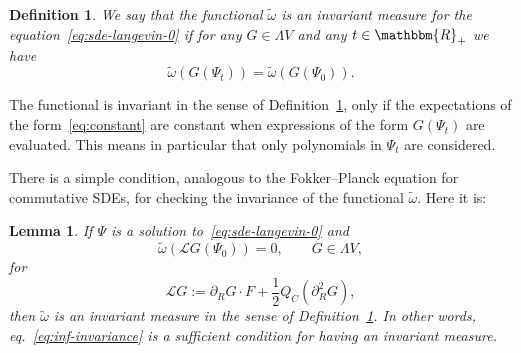 \documentclass[11pt]{article}
\newcommand{\assign}{:=}
\newtheorem{definition}{Definition}
\newtheorem{lemma}{Lemma}
\begin{document}
\begin{definition}
  \label{definition_invariant}We say that the functional $\tilde{\omega}$ is
  an invariant measure for the equation~{\eqref{eq:sde-langevin-0}} if for any
  $G \in \Lambda V$ and any $t \in \mathbbm{R}_+$ we have
  \begin{equation}
    \tilde{\omega} (G (\Psi_t)) = \tilde{\omega} (G (\Psi_0)) .
    \label{eq:constant}
  \end{equation}
\end{definition}

\begin{remark}
  The functional is invariant in the sense of
  Definition~\ref{definition_invariant}, only if the expectations of the
  form~{\eqref{eq:constant}} are constant when expressions of the form $G
  (\Psi_t)$ are evaluated. This means in particular that only polynomials in
  $\Psi_t$ are considered.
\end{remark}

There is a simple condition, analogous to the Fokker--Planck equation for
commutative SDEs, for checking the invariance of the functional
$\tilde{\omega}$. Here it is:

\begin{lemma}
  \label{lemma_invariant}If $\Psi$ is a solution
  to~{\eqref{eq:sde-langevin-0}} and
  \begin{equation}
    \tilde{\omega} (\mathcal{L}G (\Psi_0)) = 0, \qquad G \in \Lambda V
    \label{eq:inf-invariance},
  \end{equation}
  for
  \[ \mathcal{L}G \assign \partial_R G \cdot F + \frac{1}{2} Q_C (\partial_R^2
     G), \]
  then $\tilde{\omega}$ is an invariant measure in the sense of
  Definition~\ref{definition_invariant}. In other words,
  eq.~{\eqref{eq:inf-invariance}} is a sufficient condition for having an
  invariant measure.
\end{lemma}
\end{document}
